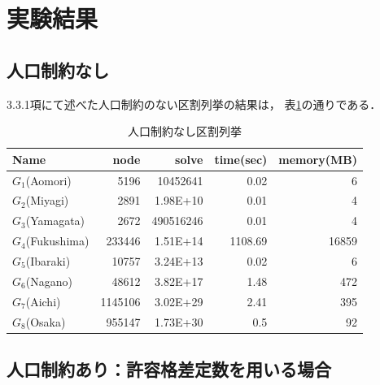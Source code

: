 \section{実験結果}

\subsection{人口制約なし}

3.3.1項にて述べた人口制約のない区割列挙の結果は，
表\ref{out_normal}の通りである．

\begin{table}[htbp]
  \caption{人口制約なし区割列挙}
  \label{out_normal}
  \centering
  \begin{tabular}{l||r|r|r|r}
    \hline
    Name & node & solve & time(sec) & memory(MB) \\
    \hline \hline
    $G_1$(Aomori) & 5196 & 10452641 & 0.02 & 6 \\
    $G_2$(Miyagi) & 2891 & 1.98E+10 & 0.01 & 4 \\
    $G_3$(Yamagata) & 2672 & 490516246 & 0.01 & 4 \\
    $G_4$(Fukushima) & 233446 & 1.51E+14 & 1108.69 & 16859 \\
    $G_5$(Ibaraki) & 10757 & 3.24E+13 & 0.02 & 6 \\
    $G_6$(Nagano) & 48612 & 3.82E+17 & 1.48 & 472 \\
    $G_7$(Aichi) & 1145106 & 3.02E+29 & 2.41 & 395 \\
    $G_8$(Osaka) & 955147 & 1.73E+30 & 0.5 & 92 \\
    \hline
  \end{tabular}
\end{table}


\subsection{人口制約あり：許容格差定数を用いる場合}


